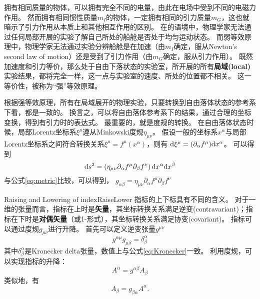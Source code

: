 拥有相同质量的物体，可以拥有完全不同的电量，由此在电场中受到不同的电磁力作用。
然而拥有相同惯性质量$m_I$的物体，一定拥有相同的引力质量$m_G$，这也就暗示了引力作用从本质上和其他相互作用的区别。
在\SR 的语境中，物理学家无法通过任何局部开展的实验了解自己所处的船舱是否处于均匀运动状态。
而弱等效原理中，物理学家无法通过实验分辨船舱是在加速（由$m_I$确定，服从Newton's second law of motion）还是受到了引力作用（由$m_G$确定，服从引力作用）。 既然加速度和引力等价，那么处于自由下落状态的实验室，所开展的所有{\textbf{局域(local)}}实验结果，都将完全一样，这一点与实验室的速度、所处的位置都不相关。
这一等价性，被称为“强”等效原理。\cite{Schutz:FirstCourse}

根据强等效原理，所有在局域展开的物理实验，只要转换到自由落体状态的参考系下看，都是一致的。
换言之，可以将自由落体参考系下的结果，通过合理的坐标变换，得到有引力时的表达式。
最重要的，就是度规的转换。
在自由落体状态时候，局部Lorentz坐标系$\xi^\mu$遵从Minkowski度规$\eta_{\mu\nu}$。
假设一般的坐标系$x^\alpha$与局部Lorentz坐标系之间符合转换关系$\xi ^\mu= f^\mu (x^\alpha)$，则有 ${\rm d} \xi ^\mu = (\partial_\alpha f^\mu) {\rm d}x^\alpha$。
可以得到 
\begin{equation}\label{eq:STinterval_diff_GR} 
  {\rm d}s^2 = \left( \eta_ {\mu \nu} \partial_\alpha f^\mu \partial_\beta f^\nu\right){\rm d} x^\alpha {\rm d} x^\beta
\end{equation}
与公式\ref{eq:metric}比较，可以得到，
$g_{\alpha\beta} = \eta_ {\mu \nu} \partial_\alpha f^\mu \partial_\beta f^\nu$

\begin{myprop}{Raising and Lowering of index}{RaiseLower}
  指标的上下标具有不同的含义。
  对于一维的张量而言，指标在上时是{\textbf{矢量}}，其坐标转换关系满足逆变(contravariant)；指标在下时是{\textbf{对偶矢量}}（或1-形式），其坐标转换关系满足协变(covariant)。
  指标可以通过度规$g_{\mu\nu}$进行升降。
  首先可以定义逆变张量$g^{\mu\nu}$
\begin{equation}\label{eq:RaiseLower} 
  g^{\alpha\mu} g_{\mu\beta}=  \delta^{\alpha}_{\beta}
\end{equation}
  其中$\delta^{\alpha}_{\beta}$是Kronecker delta张量，数值上与公式\ref{eq:Kronecker}一致。
  利用度规，可以实现指标的升降：
\begin{equation}\label{eq:Raise} 
  A^\alpha = g^{\alpha\beta} A_{\beta}  
\end{equation}
类似地，有
\begin{equation}\label{eq:Lower} 
  A_{\beta}= g_{\beta\alpha}  A^\alpha .
\end{equation}

\end{myprop}


